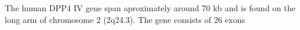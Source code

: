 The human DPP4 IV gene span aproximately around 70 kb and is found on the long arm of chromosome 2 (2q24.3). The gene consists of 26 exons